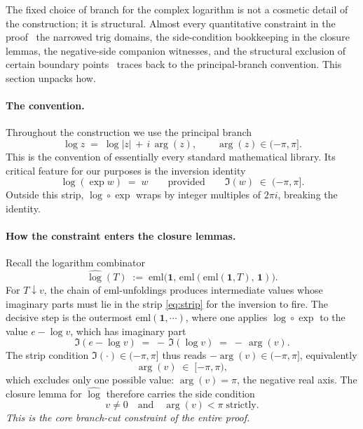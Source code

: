 \documentclass[11pt]{article}
\theoremstyle{plain}
\theoremstyle{definition}
\begin{document}
The fixed choice of branch for the complex logarithm is not a cosmetic
detail of the construction; it is structural. Almost every quantitative
constraint in the proof \textemdash\ the narrowed trig domains, the
side-condition bookkeeping in the closure lemmas, the negative-side
companion witnesses, and the structural exclusion of certain boundary
points \textemdash\ traces back to the principal-branch convention.
This section unpacks how.

\paragraph{The convention.}
Throughout the construction we use the principal branch
\[
  \log z \;=\; \log|z| \,+\, i\,\arg(z),
  \qquad \arg(z) \in (-\pi, \pi].
\]
This is the convention of essentially every standard mathematical
library. Its critical feature for our purposes is the inversion
identity
\begin{equation}
  \log(\exp w) \;=\; w
  \qquad\text{provided}\qquad
  \Im(w) \;\in\; (-\pi, \pi].
  \label{eq:strip}
\end{equation}
Outside this strip, $\log \circ \exp$ wraps by integer multiples of
$2\pi i$, breaking the identity.

\paragraph{How the constraint enters the closure lemmas.}
Recall the logarithm combinator
\[
  \widehat{\log}(T) \;:=\;
    \mathrm{eml}\!\bigl(\mathbf{1},\,
      \mathrm{eml}(\mathrm{eml}(\mathbf{1}, T),\, \mathbf{1})\bigr).
\]
For $T \downarrow v$, the chain of $\mathrm{eml}$-unfoldings produces
intermediate values whose imaginary parts must lie in the strip
\eqref{eq:strip} for the inversion to fire. The decisive step is the
outermost $\mathrm{eml}(\mathbf{1}, \cdots)$, where one applies
$\log\!\circ\!\exp$ to the value $e - \log v$, which has imaginary part
\[
  \Im(e - \log v) \;=\; -\,\Im(\log v) \;=\; -\,\arg(v).
\]
The strip condition $\Im(\cdot) \in (-\pi, \pi]$ thus reads
$-\arg(v) \in (-\pi, \pi]$, equivalently
\[
  \arg(v) \;\in\; [-\pi, \pi),
\]
which excludes only one possible value: $\arg(v) = \pi$, the negative
real axis. The closure lemma for $\widehat{\log}$ therefore carries
the side condition
\[
  v \ne 0 \quad\text{and}\quad \arg(v) < \pi \;\text{strictly}.
\]
\emph{This is the core branch-cut constraint of the entire proof.}
\end{document}
